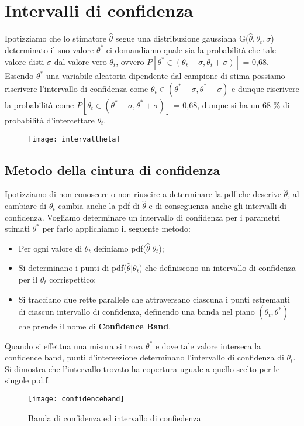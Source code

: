 \section{Intervalli di confidenza}

Ipotizziamo che lo stimatore $\hat{\theta}$ segue una distribuzione gaussiana G($\hat{\theta},\theta_t,\sigma$) determinato il suo valore $\theta^*$ ci domandiamo quale sia la probabilit\`{a} che tale valore disti $\sigma$ dal valore vero $\theta_t$, ovvero $P[\theta^* \in (\theta_t - \sigma, \theta_t + \sigma)]$ = 0,68. Essendo $\theta^*$ una variabile aleatoria dipendente dal campione di stima possiamo riscrivere l'intervallo di confidenza come $ \theta_t \in (\theta^* - \sigma,\theta^* + \sigma)$ e dunque riscrivere la probabilit\`{a} come $P[\theta_t \in (\theta^* - \sigma, \theta^* + \sigma)]$ = 0,68, dunque si ha un 68 \% di probabilit\`{a} d'intercettare $\theta_t$.
\begin{figure}[ht]
\vspace{0.1in}
\texttt{[image: intervaltheta]}	
\centering
\end{figure}

\subsection{Metodo della cintura di confidenza}

Ipotizziamo di non conoscere o non riuscire a determinare la pdf che descrive $\hat{\theta}$, al cambiare di $\theta_t$ cambia anche la pdf di $\hat{\theta}$ e di conseguenza anche gli intervalli di confidenza. Vogliamo determinare un intervallo di confidenza per i parametri stimati $\theta^*$ per farlo applichiamo il seguente metodo:

\begin{itemize}
	\item Per ogni valore di $\theta_t$ definiamo pdf($\hat{\theta} \vert \theta_t$);
	\item Si determinano i punti di pdf($\hat{\theta} \vert \theta_t$) che definiscono un intervallo di confidenza per il $\theta_t$ corrispettico;
	\item Si tracciano due rette parallele che attraversano ciascuna i punti estremanti di ciascun intervallo di confidenza, definendo una banda nel piano $(\theta_t,\theta^*)$ che prende il nome di \textbf{Confidence Band}.
\end{itemize}
Quando si effettua una misura si trova $\theta^*$ e dove tale valore interseca la confidence band, punti
d'intersezione determinano l'intervallo di confidenza di $\theta_t$. Si dimostra che l'intervallo trovato ha copertura uguale a quello scelto per le singole p.d.f.

 
\begin{figure}[ht]
\vspace{0.2in}
\texttt{[image: confidenceband]}	
\centering
\caption{Banda di confidenza ed intervallo di confiedenza}
\end{figure}
